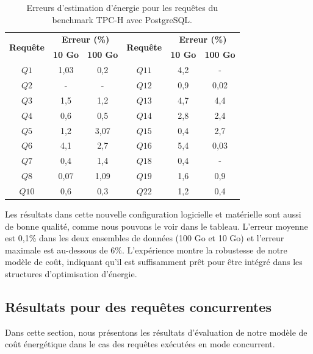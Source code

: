 \begin{table}[]
\centering
\caption {Erreurs d'estimation d'énergie pour les requêtes du benchmark TPC-H avec PostgreSQL.} \label{tab:tpch-results-postgres}
\begin{tabular}{cccccc}
\toprule
\multirow{2}{*}{\textbf{Requête}} & \multicolumn{2}{c}{\textbf{Erreur (\%)}} & \multirow{2}{*}{\textbf{Requête}} & \multicolumn{2}{c}{\textbf{Erreur (\%)}} \\ \cmidrule(lr){2-3} \cmidrule(l){5-6} 
    & \textbf{10 Go} & \textbf{100 Go} & & \textbf{10 Go} & \textbf{100 Go} \\ \midrule
	$Q1$& 1,03 & 0,2 & $Q11$ & 4,2 & - \\
	$Q2$& - & - & $Q12$ & 0,9 & 0,02 \\
	$Q3$& 1,5 & 1,2 & $Q13$ & 4,7 & 4,4 \\ 
	$Q4$& 0,6 & 0,5 & $Q14$ & 2,8 & 2,4 \\ 
	$Q5$& 1,2 & 3,07 & $Q15$ & 0,4 & 2,7 \\ 
	$Q6$& 4,1 & 2,7 & $Q16$ & 5,4 & 0,03 \\ 
	$Q7$& 0,4 & 1,4 & $Q18$ & 0,4 & - \\ 
	$Q8$& 0,07 & 1,09 & $Q19$ & 1,6 & 0,9 \\ 
	$Q10$& 0,6 & 0,3 & $Q22$ & 1,2 & 0,4 \\
	\bottomrule
    \end{tabular}
\end{table}

Les résultats dans cette nouvelle configuration logicielle et matérielle sont aussi de bonne qualité, comme nous pouvons le voir dans le tableau. L'erreur moyenne est 0,1\% dans les deux ensembles de données (100 Go et 10 Go) et l'erreur maximale est au-dessous de 6\%. L'expérience montre la robustesse de notre modèle de coût, indiquant qu'il est suffisamment prêt pour être intégré dans les structures d'optimisation d'énergie.

\subsection{Résultats pour des requêtes concurrentes}
Dans cette section, nous présentons les résultats d'évaluation de notre modèle de coût énergétique dans le cas des requêtes exécutées en mode concurrent.


